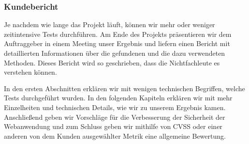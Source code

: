 \subsubsection{Kundebericht}

Je nachdem wie lange das Projekt läuft, können wir mehr oder weniger zeitintensive Tests durchführen. Am Ende des Projekts präsentieren wir dem Auftraggeber in einem Meeting unser Ergebnis und liefern einen Bericht mit detaillierten Informationen über die gefundenen  und die dazu verwendeten Methoden. Dieses Bericht wird so geschrieben, dass die Nichtfachleute es verstehen können. 

In den ersten Abschnitten erklären wir mit wenigen technischen Begriffen, welche Tests durchgeführt wurden. In den folgenden Kapiteln erklären wir mit mehr Einzelheiten und technischen Details, wie wir zu unserem Ergebnis kamen. Anschließend geben wir Vorschläge für die Verbesserung der Sicherheit der Webanwendung und zum Schluss geben wir mithilfe von \gls{CVSS} oder einer anderen von dem Kunden ausgewählter Metrik eine allgemeine Bewertung.

